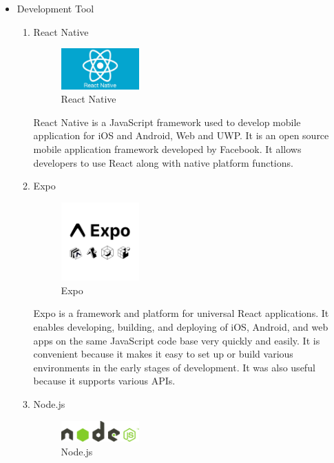 \documentclass[conference]{IEEEtran}
\begin{document}
\begin{itemize}
\item Development Tool
\begin{enumerate}
\setlength{\parindent}{2ex}
\setlength{\parskip}{0.5em}

\item React Native
\par \begin{figure}[h!]
\includegraphics[width=3cm]{image/React Native.jpg}
\centering
\caption{React Native}
\end{figure}

React Native is  a JavaScript framework used to develop mobile application for iOS and Android, Web and UWP. It is an open source mobile application framework developed by Facebook. It allows developers to use React along with native platform functions.

\item Expo
\par \begin{figure}[h!]
\includegraphics[width=3cm]{image/Expo.png}
\centering
\caption{Expo}
\end{figure}

Expo is a framework and platform for universal React applications. It enables developing, building, and deploying of iOS, Android, and web apps on the same JavaScript code base very quickly and easily. It is convenient because it makes it easy to set up or build various environments in the early stages of development. It was also useful because it supports various APIs.

\item Node.js
\par \begin{figure}[h!]
\includegraphics[width=3cm]{image/Node.js.png}
\centering
\caption{Node.js}
\end{figure}


\end{enumerate}
\end{itemize}
\end{document}
